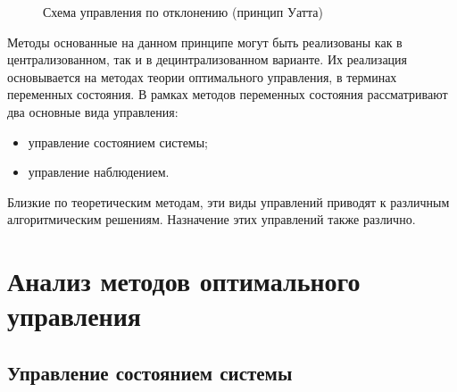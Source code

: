 \begin{figure}[!h]

\centering
{} 
\caption{Схема управления по отклонению (принцип Уатта)}
\label{fig:uatta}
\end{figure}

Методы основанные на данном принципе могут быть реализованы как в централизованном, так и в децинтрализованном варианте.
Их реализация основывается на методах теории оптимального управления, в терминах переменных состояния.
В рамках методов переменных состояния рассматривают два основные вида управления:
\begin{itemize}
 \item управление состоянием системы;
 \item управление наблюдением.
\end{itemize}

Близкие по теоретическим методам, эти виды управлений приводят к различным алгоритмическим решениям.
Назначение этих управлений также различно.

\section{Анализ методов оптимального управления}

\subsection{Управление состоянием системы}

